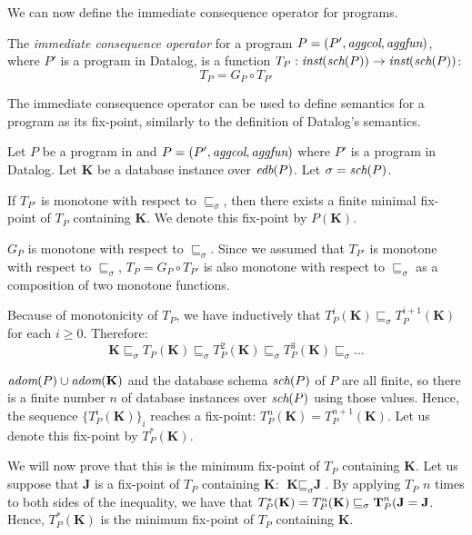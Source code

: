 We can now define the immediate consequence operator for \datalogra programs.

\begin{defn}
The \emph{immediate consequence operator} for a \datalogra program $P = (P', \textit{aggcol}, \textit{aggfun})$, where $P'$ is a program in Datalog, is a function $T_P: \textit{inst}(\textit{sch}(P)) \to \textit{inst}(\textit{sch}(P))$:
$$T_P = G_P \circ T_{P'}$$
\end{defn}

The immediate consequence operator can be used to define semantics for a \datalogra program as its fix-point, similarly to the definition of Datalog's semantics.

\begin{thm}
Let $P$ be a program in \datalogra and $P = (P', \textit{aggcol}, \textit{aggfun})$ where $P'$ is a program in Datalog. Let $\textbf{K}$ be a database instance over $\textit{edb}(P)$. Let $\sigma = \textit{sch}(P)$.

If $T_{P'}$ is monotone with respect to $\sqsubseteq_\sigma$, then there exists a finite minimal fix-point of $T_P$ containing $\textbf{K}$. We denote this fix-point by $P(\textbf{K})$.
\end{thm}
\begin{prof}
$G_P$ is monotone with respect to $\sqsubseteq_\sigma$. Since we assumed that $T_{P'}$ is monotone with respect to $\sqsubseteq_\sigma$, $T_P = G_P \circ T_{P'}$ is also monotone with respect to $\sqsubseteq_\sigma$ as a composition of two monotone functions. 

Because of monotonicity of $T_P$, we have inductively that $T_P^i(\textbf{K}) \sqsubseteq_\sigma T_P^{i+1}(\textbf{K})$ for each $i \ge 0$. Therefore:
$$\textbf{K} \sqsubseteq_\sigma T_P(\textbf{K}) \sqsubseteq_\sigma T_P^2(\textbf{K}) \sqsubseteq_\sigma T_P^3(\textbf{K}) \sqsubseteq_\sigma \dots$$

$\textit{adom}(P) \cup \textit{adom}(\textbf{K})$ and the database schema $\textit{sch}(P)$ of $P$ are all finite, so there is a finite number $n$ of database instances over $\textit{sch}(P)$ using those values. Hence, the sequence $\{T_P^i(\textbf{K})\}_i$ reaches a fix-point: $T_P^n(\textbf{K}) = T_P^{n+1}(\textbf{K})$. Let us denote this fix-point by $T_P^*(\textbf{K})$.

We will now prove that this is the minimum fix-point of $T_P$ containing $\textbf{K}$. Let us suppose that $\textbf{J}$ is a fix-point of $T_P$ containing  $\textbf{K}$:  $\textbf{K} \sqsubseteq_\sigma \textbf{J}$. By applying $T_P$ $n$ times to both sides of the inequality, we have that $T_P^*(\textbf{K}) = T_P^n(\textbf{K}) \sqsubseteq_\sigma \textbf T_P^n(\textbf{J} = \textbf{J}$. Hence, $T_P^*(\textbf{K})$ is the minimum fix-point of $T_P$ containing $\textbf{K}$.

\end{prof}

